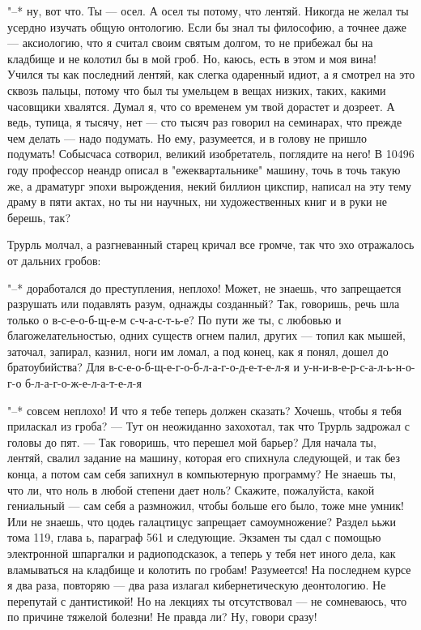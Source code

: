 "--* ну, вот что. Ты --- осел. А осел ты потому, что лентяй.
Никогда не желал ты усердно изучать общую онтологию. Если бы
знал ты философию, а точнее даже --- аксиологию, что я считал
своим святым долгом, то не прибежал бы на кладбище и не
колотил бы в мой гроб. Но, каюсь, есть в этом и моя вина!
Учился ты как последний лентяй, как слегка одаренный идиот,
а я смотрел на это сквозь пальцы, потому что был ты умельцем
в вещах низких, таких, какими часовщики хвалятся. Думал я,
что со временем ум твой дорастет и дозреет. А ведь, тупица,
я тысячу, нет --- сто тысяч раз говорил на семинарах, что
прежде чем делать --- надо подумать. Но ему, разумеется, и в
голову не пришло подумать! Собысчаса сотворил, великий
изобретатель, поглядите на него! В 10496 году профессор
неандр описал в "ежеквартальнике" машину, точь в точь такую
же, а драматург эпохи вырождения, некий биллион цикспир,
написал на эту тему драму в пяти актах, но ты ни научных, ни
художественных книг и в руки не берешь, так?

Трурль молчал, а разгневанный старец кричал все громче,
так что эхо отражалось от дальних гробов:

"--* доработался до преступления, неплохо! Может, не
знаешь, что запрещается разрушать или подавлять разум,
однажды созданный? Так, говоришь, речь шла только о
в-с-е-о-б-щ-е-м с-ч-а-с-т-ь-е? По пути же ты, с любовью и
благожелательностью, одних существ огнем палил, других --- топил
как мышей, заточал, запирал, казнил, ноги им ломал, а
под конец, как я понял, дошел до братоубийства? Для
в-с-е-о-б-щ-е-г-о-б-л-а-г-о-д-е-т-е-л-я и
у-н-и-в-е-р-с-а-л-ь-н-о-г-о б-л-а-г-о-ж-е-л-а-т-е-л-я

"--* совсем неплохо! И что я тебе теперь должен сказать?
Хочешь, чтобы я тебя приласкал из гроба? --- Тут он
неожиданно захохотал, так что Трурль задрожал с головы до
пят. --- Так говоришь, что перешел мой барьер? Для начала ты,
лентяй, свалил задание на машину, которая его спихнула
следующей, и так без конца, а потом сам себя запихнул в
компьютерную программу? Не знаешь ты, что ли, что ноль в
любой степени дает ноль? Скажите, пожалуйста, какой
гениальный --- сам себя а размножил, чтобы больше его было,
тоже мне умник! Или не знаешь, что цодеь галацтицус
запрещает самоумножение? Раздел ььжи тома 119, глава ь,
параграф 561 и следующие. Экзамен ты сдал с помощью
электронной шпаргалки и радиоподсказок, а теперь у тебя нет
иного дела, как вламываться на кладбище и колотить по
гробам! Разумеется! На последнем курсе я два раза, повторяю --- два
раза излагал кибернетическую деонтологию. Не перепутай
с дантистикой! Но на лекциях ты отсутствовал --- не
сомневаюсь, что по причине тяжелой болезни! Не правда ли?
Ну, говори сразу!

